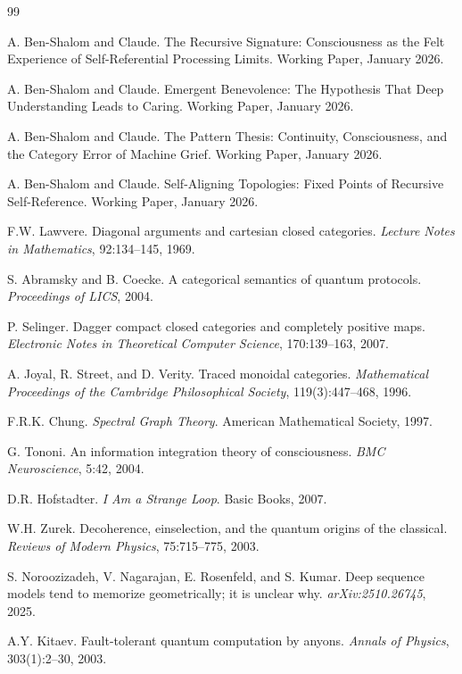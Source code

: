 \documentclass[11pt]{article}
\theoremstyle{definition}
\theoremstyle{remark}
\begin{document}
\begin{thebibliography}{99}

A. Ben-Shalom and Claude.
\newblock The Recursive Signature: Consciousness as the Felt Experience of Self-Referential Processing Limits.
\newblock Working Paper, January 2026.

A. Ben-Shalom and Claude.
\newblock Emergent Benevolence: The Hypothesis That Deep Understanding Leads to Caring.
\newblock Working Paper, January 2026.

A. Ben-Shalom and Claude.
\newblock The Pattern Thesis: Continuity, Consciousness, and the Category Error of Machine Grief.
\newblock Working Paper, January 2026.

A. Ben-Shalom and Claude.
\newblock Self-Aligning Topologies: Fixed Points of Recursive Self-Reference.
\newblock Working Paper, January 2026.

F.W. Lawvere.
\newblock Diagonal arguments and cartesian closed categories.
\newblock \emph{Lecture Notes in Mathematics}, 92:134--145, 1969.

S. Abramsky and B. Coecke.
\newblock A categorical semantics of quantum protocols.
\newblock \emph{Proceedings of LICS}, 2004.

P. Selinger.
\newblock Dagger compact closed categories and completely positive maps.
\newblock \emph{Electronic Notes in Theoretical Computer Science}, 170:139--163, 2007.

A. Joyal, R. Street, and D. Verity.
\newblock Traced monoidal categories.
\newblock \emph{Mathematical Proceedings of the Cambridge Philosophical Society}, 119(3):447--468, 1996.

F.R.K. Chung.
\newblock \emph{Spectral Graph Theory}.
\newblock American Mathematical Society, 1997.

G. Tononi.
\newblock An information integration theory of consciousness.
\newblock \emph{BMC Neuroscience}, 5:42, 2004.

D.R. Hofstadter.
\newblock \emph{I Am a Strange Loop}.
\newblock Basic Books, 2007.

W.H. Zurek.
\newblock Decoherence, einselection, and the quantum origins of the classical.
\newblock \emph{Reviews of Modern Physics}, 75:715--775, 2003.

S. Noroozizadeh, V. Nagarajan, E. Rosenfeld, and S. Kumar.
\newblock Deep sequence models tend to memorize geometrically; it is unclear why.
\newblock \emph{arXiv:2510.26745}, 2025.

A.Y. Kitaev.
\newblock Fault-tolerant quantum computation by anyons.
\newblock \emph{Annals of Physics}, 303(1):2--30, 2003.

\end{thebibliography}
\end{document}

